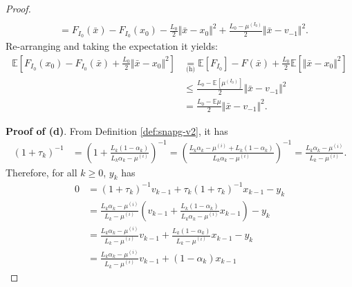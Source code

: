 \documentclass[12pt]{article}
\begin{document}
\begin{proof}
\begin{align*}
                \\
                &= F_{I_0}(\bar x) - F_{I_0}(x_0) - \frac{L_0}{2}\Vert \bar x - x_0\Vert^2 + \frac{L_0 - \mu^{(I_0)}}{2}\Vert \bar x - v_{-1}\Vert^2. 
            \end{align*}
            Re-arranging and taking the expectation it yields: 
            \begin{align*}
                \mathbb E \left[
                    F_{I_0}(x_0) - F_{I_0}(\bar x) + \frac{L_0}{2}\Vert \bar x - x_0\Vert^2
                \right]
                &\underset{\text{(h)}}{=}
                \mathbb E \left[ F_{I_0}\right] - F(\bar x) 
                + \frac{L_0}{2}\mathbb E \left[\Vert \bar x - x_0\Vert^2\right]
                \\
                &\le \frac{L_0 - \mathbb E \left[\mu^{(I_0)}\right]}{2}\Vert \bar x - v_{-1}\Vert^2
                \\
                &= \frac{L_0 - \mathbb E \mu}{2}\Vert \bar x - v_{-1}\Vert^2. 
            \end{align*}
            \par
            \textbf{Proof of (d)}.
            From Definition \ref{def:snapg-v2}, it has
            \begin{align*}
                (1 + \tau_k)^{-1}
                &=
                \left(
                    1 + \frac{L_k(1 - \alpha_k)}{L_k\alpha_k - \mu^{(i)}}
                \right)^{-1} = \left(
                    \frac{L_k\alpha_k - \mu^{(i)} + L_k(1 - \alpha_k)}{L_k\alpha_k - \mu^{(i)}}
                \right)^{-1}
                = \frac{L_k\alpha_k - \mu^{(i)}}{L_k - \mu^{(i)}}. 
            \end{align*}
            Therefore, for all $k \ge 0$, $y_k$ has 
            \begin{align*}
                0 &= (1 + \tau_k)^{-1} v_{k - 1} + \tau_k (1 + \tau_k)^{-1} x_{k - 1} - y_k
                \\
                &= \frac{L_k\alpha_k - \mu^{(i)}}{L_k - \mu^{(i)}} 
                \left(
                    v_{k - 1} + \frac{L_k(1 - \alpha_k)}{L_k\alpha_k - \mu^{(i)}} x_{k - 1}
                \right) - y_k
                \\
                &= \frac{L_k\alpha_k - \mu^{(i)}}{L_k - \mu^{(i)}} v_{k - 1}
                + \frac{L_k(1 - \alpha_k)}{L_k - \mu^{(i)}} x_{k - 1} - y_k
                \\
                &= \frac{L_k\alpha_k - \mu^{(i)}}{L_k - \mu^{(i)}} v_{k - 1} + (1 - \alpha_k)x_{k - 1}

\end{align*}
\end{proof}
\end{document}
